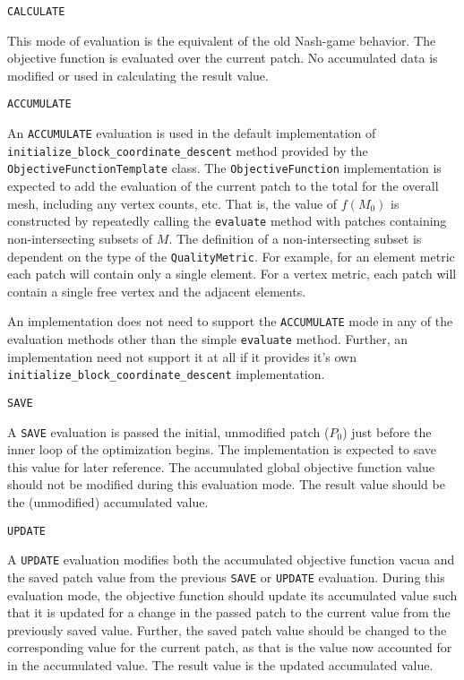 \documentclass{article}
\begin{document}
\begin{description}

\item{\texttt{CALCULATE}}

This mode of evaluation is the equivalent of the old Nash-game behavior.  The objective function is evaluated over the current patch.  No accumulated data is modified or used in calculating the result value.

\item{\texttt{ACCUMULATE}}

An \texttt{ACCUMULATE} evaluation is used in the default implementation of \\ \texttt{initialize\_block\_coordinate\_descent} method provided by the \\ \texttt{ObjectiveFunctionTemplate} class.  The \texttt{ObjectiveFunction} implementation is expected to add the evaluation of the current patch to the total for the overall mesh, including any vertex counts, etc.  That is, the value of $f(M_0)$ is constructed by repeatedly calling the \texttt{evaluate} method with patches containing non-intersecting subsets of $M$.  The definition of a non-intersecting subset is dependent on the type of the \texttt{QualityMetric}.  For example, for an element metric each patch will contain only a single element.  For a vertex metric, each patch will contain a single free vertex and the adjacent elements.  

An implementation does not need to support the \texttt{ACCUMULATE} mode in any of the evaluation methods other than the simple \texttt{evaluate}  method.  Further, an implementation need not support it at all if it provides it's own \texttt{initialize\_block\_coordinate\_descent} implementation.

\item{\texttt{SAVE}}

A \texttt{SAVE} evaluation is passed the initial, unmodified patch ($P_0$) just before the inner loop of the optimization begins.  The implementation is expected to save this value for later reference.  The accumulated global objective function value should not be modified during this evaluation mode.  The result value should be the (unmodified) accumulated value.

\item{\texttt{UPDATE}}

A \texttt{UPDATE} evaluation modifies both the accumulated objective function vacua and the saved patch value from the previous \texttt{SAVE} or \texttt{UPDATE} evaluation.  During this evaluation mode, the objective function should update its accumulated value such that it is updated for a change in the passed patch to the current value from the previously saved value.  Further, the saved patch value should be changed to the corresponding value for the current patch, as that is the value now accounted for in the accumulated value.  The result value is the updated accumulated value.


\end{description}
\end{document}
